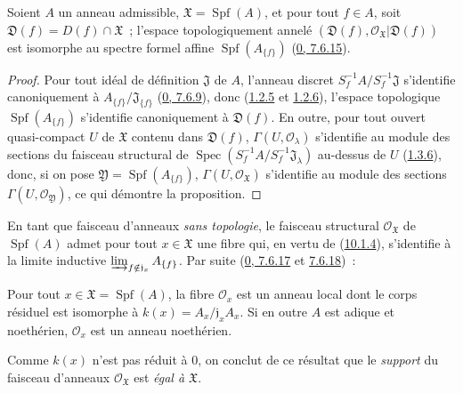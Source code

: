 \begin{proposition}[10.1.4]
\label{I.10.1.4-fr}
Soient $A$ un anneau admissible, $\mathfrak{X}=\operatorname{Spf}(A)$, et
pour tout $f\in A$, soit
$\mathfrak{D}(f)=D(f)\cap\mathfrak{X}$~; l'espace topologiquement annelé
$(\mathfrak{D}(f),\mathscr{O}_{\mathfrak{X}}|\mathfrak{D}(f))$ est
isomorphe au spectre formel affine
$\operatorname{Spf}(A_{\{f\}})$
(\hyperref[0.7.6.15-fr]{0, 7.6.15}).
\end{proposition}

\begin{proof}
Pour tout idéal de définition $\mathfrak{J}$ de $A$, l'anneau discret
$S_f^{-1}A/S_f^{-1}\mathfrak{J}$ s'identifie canoniquement à
$A_{\{f\}}/\mathfrak{J}_{\{f\}}$
(\hyperref[0.7.6.9-fr]{0, 7.6.9}), donc
(\hyperref[I.1.2.5-fr]{1.2.5} et \hyperref[I.1.2.6-fr]{1.2.6}), l'espace
topologique $\operatorname{Spf}(A_{\{f\}})$ s'identifie canoniquement à
$\mathfrak{D}(f)$. En outre, pour tout ouvert quasi-compact $U$ de
$\mathfrak{X}$ contenu dans $\mathfrak{D}(f)$,
$\Gamma(U,\mathscr{O}_\lambda)$ s'identifie au module des sections du
faisceau structural de
$\operatorname{Spec}(S_f^{-1}A/S_f^{-1}\mathfrak{J}_\lambda)$ au-dessus de
$U$ (\hyperref[I.1.3.6-fr]{1.3.6}), donc, si on pose
$\mathfrak{Y}=\operatorname{Spf}(A_{\{f\}})$,
$\Gamma(U,\mathscr{O}_{\mathfrak{X}})$ s'identifie au module des sections
$\Gamma(U,\mathscr{O}_{\mathfrak{Y}})$, ce qui démontre la proposition.
\end{proof}

\begin{env}[10.1.5]
\label{I.10.1.5-fr}
En tant que faisceau d'anneaux \emph{sans topologie}, le faisceau
structural $\mathscr{O}_{\mathfrak{X}}$ de
$\operatorname{Spf}(A)$ admet pour tout $x\in\mathfrak{X}$ une fibre qui,
en vertu de (\hyperref[I.10.1.4-fr]{10.1.4}), s'identifie à la limite
inductive
$\varinjlim_{f\notin\mathfrak{j}_x}A_{\{f\}}$. Par suite
(\hyperref[0.7.6.17-fr]{0, 7.6.17} et
\hyperref[0.7.6.18-fr]{7.6.18})~:
\end{env}

\begin{proposition}[10.1.6]
\label{I.10.1.6-fr}
Pour tout $x\in\mathfrak{X}=\operatorname{Spf}(A)$, la fibre
$\mathscr{O}_x$ est un anneau local dont le corps résiduel est isomorphe à
$k(x)=A_x/\mathfrak{j}_xA_x$. Si en outre $A$ est adique et noethérien,
$\mathscr{O}_x$ est un anneau noethérien.
\end{proposition}

Comme $k(x)$ n'est pas réduit à 0, on conclut de ce résultat que le
\emph{support} du faisceau d'anneaux $\mathscr{O}_{\mathfrak{X}}$ est
\emph{égal à $\mathfrak{X}$}.

